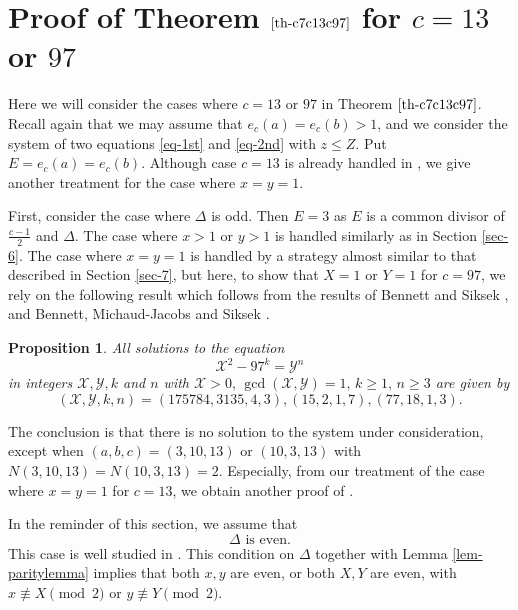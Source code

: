 \documentclass[11pt]{amsart}
\newtheorem{prop}{Proposition}[section]
\numberwithin{equation}{section}
\begin{document}
\section{Proof of Theorem $\ref{th-c7c13c97}$ for $c=13$ or $97$} \label{sec-8}

Here we will consider the cases where $c=13$ or $97$ in Theorem $\ref{th-c7c13c97}$.
Recall again that we may assume that $e_c(a)=e_c(b)>1$, and we consider the system of two equations \eqref{eq-1st} and \eqref{eq-2nd} with $z \le Z$.
Put $E=e_c(a)=e_c(b)$.
Although case $c=13$ is already handled in \cite{MP3}, we give another treatment for the case where $x=y=1$.

First, consider the case where $\Delta$ is odd.
Then $E=3$ as $E$ is a common divisor of $\frac{c-1}{2}$ and $\Delta$.
The case where $x>1$ or $y>1$ is handled similarly as in Section \ref{sec-6}.
The case where $x=y=1$ is handled by a strategy almost similar to that described in Section \ref{sec-7}, but here, to show that $X=1$ or $Y=1$ for $c=97$, we rely on the following result which follows from the results of Bennett and Siksek \cite[Theorems 3 and 5;\,$q=97$]{BS}, and Bennett, Michaud-Jacobs and Siksek \cite[Theorem 1.1;\,$q=97$]{BeMicSi}.

\begin{prop}\label{prop-BS-BMS-q97}
All solutions to the equation
\[
\mathcal X^2 - 97^k = \mathcal Y^n
\]
in integers $\mathcal X,\mathcal Y,k$ and $n$ with $\mathcal X>0,\,\gcd(\mathcal X,\mathcal Y)=1, \,k \ge 1, \,n \ge 3$ are given by 
\[
(\mathcal X,\mathcal Y,k,n)=(175784,3135,4,3), (15,2,1,7), (77,18,1,3).
\]
\end{prop}

The conclusion is that there is no solution to the system under consideration, except when $(a,b,c)=(3,10,13)$ or $(10,3,13)$ with $N(3,10,13)=N(10,3,13)=2$.
Especially, from our treatment of the case where $x=y=1$ for $c=13$, we obtain another proof of \cite[Theorem 3]{MP3}.

In the reminder of this section, we assume that 
\[ \text{
$\Delta$ is even.
}\]
This case is well studied in \cite{MP2}.
This condition on $\Delta$ together with Lemma \ref{lem-paritylemma} implies that both $x, y$ are even, or both $X, Y$ are even, with $x \not\equiv X \pmod{2}$ or $y \not\equiv Y \pmod{2}$.
\end{document}
